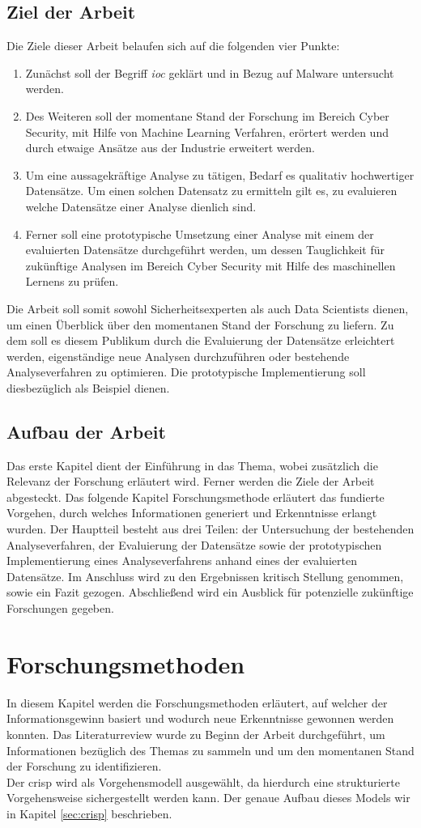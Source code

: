 \documentclass[
    12pt, %
    DIV10,
    ngerman, %
    a4paper, %
    oneside, %
    titlepage, %
    parskip=half, %
    headings=normal, %
    listof=totoc, %
    bibliography=totoc, %
    index=totoc, %
    captions=tableheading, %
    final %
]{scrreprt}
\begin{document}
\section{Ziel der Arbeit}
Die Ziele dieser Arbeit belaufen sich auf die folgenden vier Punkte:
\begin{enumerate}
\item Zunächst soll der Begriff \emph{\acl{ioc}} geklärt und in Bezug auf Malware untersucht werden. 
\item Des Weiteren soll der momentane Stand der Forschung im Bereich Cyber Security, mit Hilfe von Machine Learning Verfahren, erörtert werden und durch etwaige Ansätze aus der Industrie erweitert werden.
\item Um eine aussagekräftige Analyse zu tätigen, Bedarf es qualitativ hochwertiger Datensätze. Um einen solchen Datensatz zu ermitteln gilt es, zu evaluieren welche Datensätze einer Analyse dienlich sind.
\item Ferner soll eine prototypische Umsetzung einer Analyse mit einem der evaluierten Datensätze durchgeführt werden, um dessen Tauglichkeit für zukünftige Analysen im Bereich Cyber Security mit Hilfe des maschinellen Lernens zu prüfen.
\end{enumerate}
Die Arbeit soll somit sowohl Sicherheitsexperten als auch Data Scientists dienen, um einen Überblick über den momentanen Stand der Forschung zu liefern. Zu dem soll es diesem Publikum durch die Evaluierung der Datensätze erleichtert werden, eigenständige neue Analysen durchzuführen oder bestehende Analyseverfahren zu optimieren. Die prototypische Implementierung soll diesbezüglich als Beispiel dienen.
\section{Aufbau der Arbeit}
Das erste Kapitel dient der Einführung in das Thema, wobei zusätzlich die Relevanz der Forschung erläutert wird. Ferner werden die Ziele der Arbeit abgesteckt. Das folgende Kapitel Forschungsmethode erläutert das fundierte Vorgehen, durch welches Informationen generiert und Erkenntnisse erlangt wurden. Der Hauptteil besteht aus drei Teilen: der Untersuchung der bestehenden Analyseverfahren, der Evaluierung der Datensätze sowie der prototypischen Implementierung eines Analyseverfahrens anhand eines der evaluierten Datensätze. Im Anschluss wird zu den  Ergebnissen kritisch Stellung genommen, sowie ein Fazit gezogen. Abschließend wird ein Ausblick für potenzielle zukünftige Forschungen gegeben.
\chapter{Forschungsmethoden}
In diesem Kapitel werden die Forschungsmethoden erläutert, auf welcher der Informationsgewinn basiert und wodurch neue Erkenntnisse gewonnen werden konnten. Das Literaturreview wurde zu Beginn der Arbeit durchgeführt, um Informationen bezüglich des Themas zu sammeln und um den momentanen Stand der Forschung zu identifizieren.\\
Der \ac{crisp} wird als Vorgehensmodell ausgewählt, da hierdurch eine strukturierte Vorgehensweise sichergestellt werden kann. Der genaue Aufbau dieses Models wir in Kapitel \ref{sec:crisp} beschrieben.
\end{document}
